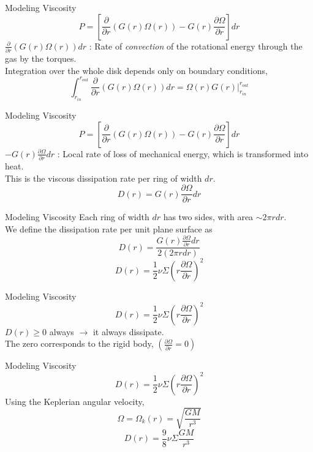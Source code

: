\documentclass{beamer}
\begin{document}
\begin{frame}{Modeling Viscosity}
	\[P = \left[ \frac{\partial}{\partial r}  \left( G(r) \Omega (r) \right) - G(r) \frac{\partial \Omega}{\partial r}  \right] dr  \]
	$\frac{\partial}{\partial r}  \left( G(r) \Omega (r) \right) dr$ : Rate of \textit{convection} of the rotational energy through the gas by the torques. \\
	\pause
	Integration over the whole disk depends only on boundary conditions,
	\pause
	\[ \int_{r_{in}} ^{r_{out}} \frac{\partial}{\partial r}  \left( G(r) \Omega (r) \right) dr = \left. \Omega (r) G(r) \right|_{r_{in}} ^{r_{out}}\]
\end{frame}

\begin{frame}{Modeling Viscosity}
	\[P = \left[ \frac{\partial}{\partial r}  \left( G(r) \Omega (r) \right) - G(r) \frac{\partial \Omega}{\partial r}  \right] dr  \]
	$ - G(r) \frac{\partial \Omega}{\partial r} dr$ : Local rate of loss of mechanical energy, which is transformed into heat. \\
	\pause
	This is the viscous dissipation rate per ring of width $dr$.
	\pause
	\[ D(r) = G(r) \frac{\partial \Omega}{\partial r} dr\]
\end{frame}

\begin{frame}{Modeling Viscosity}
	Each ring of width $dr$ has two sides, with area $\sim 2\pi r dr$.\\
	\pause
	We define the dissipation rate per unit plane surface as
	\[ D(r) = \frac{ G(r) \frac{\partial \Omega}{\partial r} dr }{2 (2\pi r dr)}\]
	\pause
	\[D(r) = \frac{1}{2} \nu \Sigma \left( r \frac{\partial \Omega}{\partial r} \right)^2 \]
\end{frame}

\begin{frame}{Modeling Viscosity}
	\[D(r) = \frac{1}{2} \nu \Sigma \left( r \frac{\partial \Omega}{\partial r} \right)^2 \]
	\pause
	$D(r)\geq 0$ always $\rightarrow$ it always dissipate.\\
	\pause
	The zero corresponds to the rigid body, $\left( \frac{\partial \Omega}{\partial r}  = 0 \right)$
\end{frame}

\begin{frame}{Modeling Viscosity}
	\[D(r) = \frac{1}{2} \nu \Sigma \left( r \frac{\partial \Omega}{\partial r} \right)^2 \]
	\pause
	Using the Keplerian  angular velocity,
	\[ \Omega = \Omega_k (r) = \sqrt{\frac{GM}{r^3}} \]
	\pause
	\[D(r) = \frac{9}{8} \nu \Sigma \frac{GM}{r^3} \]
\end{frame}
\end{document}
